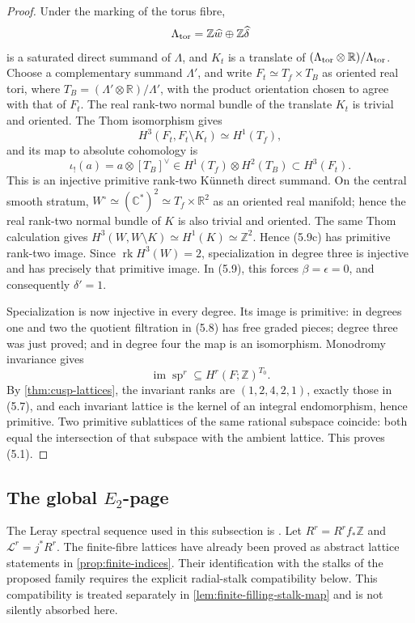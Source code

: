 \begin{proof}
Under the marking of the torus fibre,
\[
 \Lambda_{\rm tor}=\mathbb Z\widehat w\oplus
                    \mathbb Z\widehat\delta
\]
is a saturated direct summand of \(\Lambda\), and \(K_t\) is a translate of
\((\Lambda_{\rm tor}\otimes\mathbb R)/\Lambda_{\rm tor}\).  Choose a
complementary summand \(\Lambda'\), and write
\(F_t\simeq T_f\times T_B\) as oriented real tori, where
\(T_B=(\Lambda'\otimes\mathbb R)/\Lambda'\), with the product orientation
chosen to agree with that of \(F_t\).  The real rank-two normal bundle of
the translate \(K_t\) is trivial and oriented.  The Thom isomorphism gives
\[
H^3(F_t,F_t\setminus K_t)\simeq H^1(T_f),
\]
and its map to absolute cohomology is
\[
 \iota_!(a)=a\otimes[T_B]^\vee
 \in H^1(T_f)\otimes H^2(T_B)\subset H^3(F_t).
\tag{5.9d}
\]
This is an injective primitive rank-two K\"unneth direct summand.  On the
central smooth stratum,
\(W^\circ\simeq(\mathbb C^*)^2\simeq T_f\times\mathbb R^2\) as an
oriented real manifold; hence the real rank-two normal bundle of \(K\) is
also trivial and oriented.  The same Thom calculation gives
\(H^3(W,W\setminus K)\simeq H^1(K)\simeq\mathbb Z^2\).
Hence (5.9c) has primitive rank-two image.  Since
\(\operatorname{rk}H^3(W)=2\), specialization in degree three is injective
and has precisely that primitive image.  In (5.9), this forces
\(\beta=\epsilon=0\), and consequently \(\delta'=1\).

Specialization is now injective in every degree.  Its image is primitive:
in degrees one and two the quotient filtration in (5.8) has free graded
pieces; degree three was just proved; and in degree four the map is an
isomorphism.  Monodromy invariance gives
\[
 \operatorname{im}\operatorname{sp}^r
 \subseteq H^r(F;\mathbb Z)^{T_0}.
\]
By \cref{thm:cusp-lattices}, the invariant ranks are
\((1,2,4,2,1)\), exactly those in (5.7), and each invariant lattice is the
kernel of an integral endomorphism, hence primitive.  Two primitive
sublattices of the same rational subspace coincide: both equal the
intersection of that subspace with the ambient lattice.  This proves (5.1).
\end{proof}

\subsection{The global \texorpdfstring{\(E_2\)}{E2}-page}

The Leray spectral sequence used in this subsection is
\cite[Corollary~2.3.4]{Dimca2004}.
Let \(R^r=R^rf_*\mathbb Z\) and
\(\mathcal L^r=j^*R^r\).  The finite-fibre lattices have already been proved
as abstract lattice statements in \cref{prop:finite-indices}.  Their
identification with the stalks of the proposed family requires the explicit
radial-stalk compatibility below.  This compatibility is treated separately
in \cref{lem:finite-filling-stalk-map} and is not silently absorbed here.

